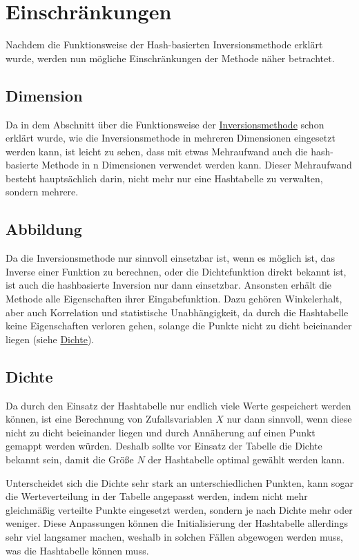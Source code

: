 \section{Einschränkungen}
Nachdem die Funktionsweise der Hash-basierten Inversionsmethode erklärt wurde, 
werden nun mögliche Einschränkungen der Methode näher betrachtet.


\subsection{Dimension}
Da in dem Abschnitt über die Funktionsweise der \hyperref[funktion]{Inversionsmethode} 
schon erklärt wurde, wie die Inversionsmethode in mehreren Dimensionen eingesetzt werden kann, 
ist leicht zu sehen, dass mit etwas Mehraufwand auch die hash-basierte Methode in n Dimensionen 
verwendet werden kann. Dieser Mehraufwand besteht hauptsächlich darin, nicht 
mehr nur eine Hashtabelle zu verwalten, sondern mehrere. 


\subsection{Abbildung}
Da die Inversionsmethode nur sinnvoll einsetzbar ist, wenn es möglich ist, das Inverse einer Funktion zu 
berechnen, oder die Dichtefunktion direkt bekannt ist, ist auch die hashbasierte Inversion nur dann einsetzbar.
Ansonsten erhält die Methode alle Eigenschaften ihrer Eingabefunktion. Dazu gehören Winkelerhalt, aber auch 
Korrelation und statistische Unabhängigkeit, da durch die Hashtabelle keine Eigenschaften verloren gehen, solange 
die Punkte nicht zu dicht beieinander liegen (siehe \hyperref[Dichte]{Dichte}).  


\subsection{Dichte}
\label{Dichte}
Da durch den Einsatz der Hashtabelle nur endlich viele Werte gespeichert werden können, ist eine Berechnung 
von Zufallsvariablen $X$ nur dann sinnvoll, wenn diese nicht zu dicht beieinander liegen und durch Annäherung 
auf einen Punkt gemappt werden würden. Deshalb sollte vor Einsatz der Tabelle die Dichte bekannt sein, damit die 
Größe $N$ der Hashtabelle optimal gewählt werden kann.

Unterscheidet sich die Dichte sehr stark an unterschiedlichen Punkten, kann sogar die Werteverteilung in der Tabelle 
angepasst werden, indem nicht mehr gleichmäßig verteilte Punkte eingesetzt werden, sondern je nach Dichte mehr 
oder weniger. Diese Anpassungen können die Initialisierung der Hashtabelle allerdings sehr viel langsamer machen, 
weshalb in solchen Fällen abgewogen werden muss, was die Hashtabelle können muss.